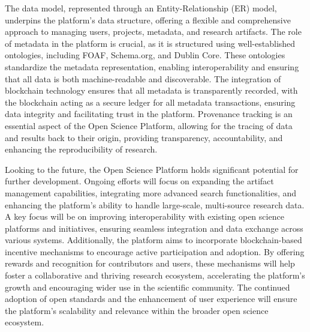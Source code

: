 \documentclass{article}
\begin{document}
The data model, represented through an Entity-Relationship (ER) model, underpins the platform's data structure, offering a flexible and comprehensive approach to managing users, projects, metadata, and research artifacts. The role of metadata in the platform is crucial, as it is structured using well-established ontologies, including FOAF, Schema.org, and Dublin Core. These ontologies standardize the metadata representation, enabling interoperability and ensuring that all data is both machine-readable and discoverable. The integration of blockchain technology ensures that all metadata is transparently recorded, with the blockchain acting as a secure ledger for all metadata transactions, ensuring data integrity and facilitating trust in the platform. Provenance tracking is an essential aspect of the Open Science Platform, allowing for the tracing of data and results back to their origin, providing transparency, accountability, and enhancing the reproducibility of research.

Looking to the future, the Open Science Platform holds significant potential for further development. Ongoing efforts will focus on expanding the artifact management capabilities, integrating more advanced search functionalities, and enhancing the platform’s ability to handle large-scale, multi-source research data. A key focus will be on improving interoperability with existing open science platforms and initiatives, ensuring seamless integration and data exchange across various systems. Additionally, the platform aims to incorporate blockchain-based incentive mechanisms to encourage active participation and adoption. By offering rewards and recognition for contributors and users, these mechanisms will help foster a collaborative and thriving research ecosystem, accelerating the platform's growth and encouraging wider use in the scientific community. The continued adoption of open standards and the enhancement of user experience will ensure the platform’s scalability and relevance within the broader open science ecosystem.
\end{document}
